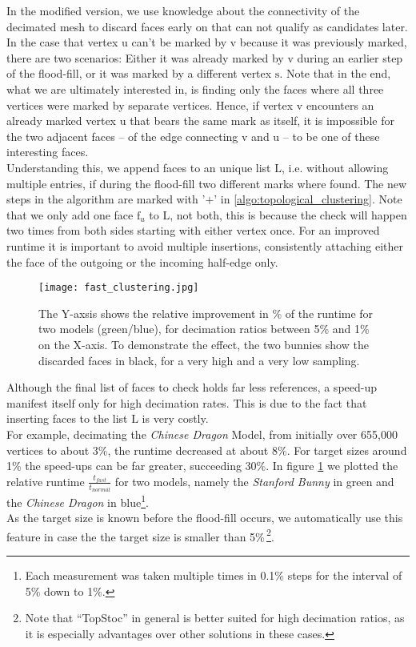 In the modified version, we use knowledge about the connectivity of the decimated mesh to discard faces early on that can not qualify as candidates later.
In the case that vertex $\mathrm{u}$ can't be marked by $\mathrm{v}$ because it was previously marked, there are two scenarios:
Either it was already marked by $\mathrm{v}$ during an earlier step of the flood-fill, or it was marked by a different vertex $\mathrm{s}$.
Note that in the end, what we are ultimately interested in, is finding only the faces where all three vertices were marked by separate vertices.
Hence, if vertex $\mathrm{v}$ encounters an already marked vertex $\mathrm{u}$ that bears the same mark as itself, it is impossible for the two adjacent faces -- of the edge connecting $\mathrm{v}$ and $\mathrm{u}$ -- to be one of these interesting faces.\\
Understanding this, we append faces to an unique list $\mathrm{L}$, i.e. without allowing multiple entries, if during the flood-fill two different marks where found.
The new steps in the algorithm are marked with '$+$' in \ref{algo:topological_clustering}.
Note that we only add one face $\mathrm{f}_{u}$ to $\mathrm{L}$, not both, this is because the check will happen two times from both sides starting with either vertex once.
For an improved runtime it is important to avoid multiple insertions, consistently attaching either the face of the outgoing or the incoming half-edge only.

\begin{figure}[hbt]
\centering
\texttt{[image: fast\_clustering.jpg]}
\caption{The Y-axsis shows the relative improvement in \% of the runtime for two models (green/blue), for decimation ratios between 5\% and 1\% on the X-axis. To demonstrate the effect, the two bunnies show the discarded faces in black, for a very high and a very low sampling.}
\label{fig:fast_clustering}
\end{figure}
Although the final list of faces to check holds far less references, a speed-up manifest itself only for high decimation rates.
This is due to the fact that inserting faces to the list $\mathrm{L}$ is very costly.\\
For example, decimating the \textit{Chinese Dragon} Model, from initially over 655,000 vertices to about 3\%, the runtime decreased at about 8\%.
For target sizes around 1\% the speed-ups can be far greater, succeeding 30\%.
In figure \ref{fig:fast_clustering} we plotted the relative runtime $\frac{t_{fast}}{t_{normal}}$ for two models, namely the \textit{Stanford Bunny} in green and the \textit{Chinese Dragon} in blue\footnote{ Each measurement was taken multiple times in 0.1\% steps for the interval of 5\% down to 1\%.}.\\
As the target size is known before the flood-fill occurs, we automatically use this feature in case the the target size is smaller than 5\%\,\footnote{ Note that ``TopStoc'' in general is better suited for high decimation ratios, as it is especially advantages over other solutions in these cases.}.

